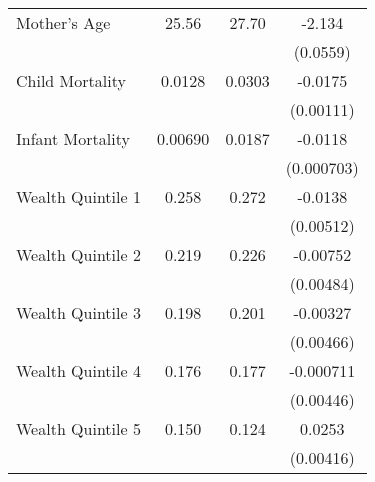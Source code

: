 \begin{table}[htbp]
\begin{tabular}{l*{1}{ccc}}
Mother's Age        &       25.56&       27.70&      -2.134\sym{***}\\
                    &            &            &    (0.0559)         \\
Child Mortality     &      0.0128&      0.0303&     -0.0175\sym{***}\\
                    &            &            &   (0.00111)         \\
Infant Mortality    &     0.00690&      0.0187&     -0.0118\sym{***}\\
                    &            &            &  (0.000703)         \\
Wealth Quintile 1   &       0.258&       0.272&     -0.0138\sym{**} \\
                    &            &            &   (0.00512)         \\
Wealth Quintile 2   &       0.219&       0.226&    -0.00752         \\
                    &            &            &   (0.00484)         \\
Wealth Quintile 3   &       0.198&       0.201&    -0.00327         \\
                    &            &            &   (0.00466)         \\
Wealth Quintile 4   &       0.176&       0.177&   -0.000711         \\
                    &            &            &   (0.00446)         \\
Wealth Quintile 5   &       0.150&       0.124&      0.0253\sym{***}\\
                    &            &            &   (0.00416)         \\
\bottomrule
\end{tabular}
\end{table}
